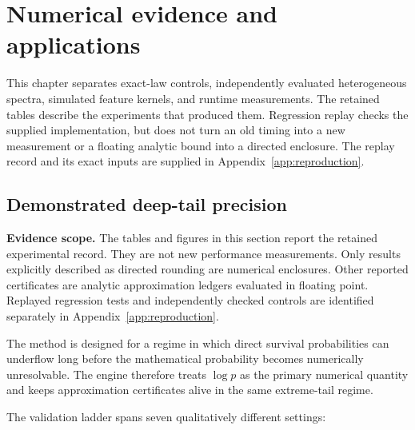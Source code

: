 \chapter{Numerical evidence and applications}\label{ch:evidence}
This chapter separates exact-law controls, independently evaluated
heterogeneous spectra, simulated feature kernels, and runtime measurements.
The retained tables describe the experiments that produced them. Regression
replay checks the supplied implementation, but does not turn an old timing
into a new measurement or a floating analytic bound into a directed enclosure.
The replay record and its exact inputs are supplied in
Appendix~\ref{app:reproduction}.
\section{Demonstrated deep-tail precision}\label{sec:final-3}
\textbf{Evidence scope.} The tables and figures in this section report the
retained experimental record. They are not new performance measurements.
Only results explicitly described as directed rounding are numerical
enclosures. Other reported certificates are analytic approximation ledgers
evaluated in floating point. Replayed regression tests and independently
checked controls are identified separately in Appendix~\ref{app:reproduction}.

The method is designed for a regime in which direct survival probabilities can
underflow long before the mathematical probability becomes numerically
unresolvable.  The engine therefore treats \(\log p\) as the primary numerical
quantity and keeps approximation certificates alive in the same extreme-tail
regime.

The validation ladder spans seven qualitatively different settings:

